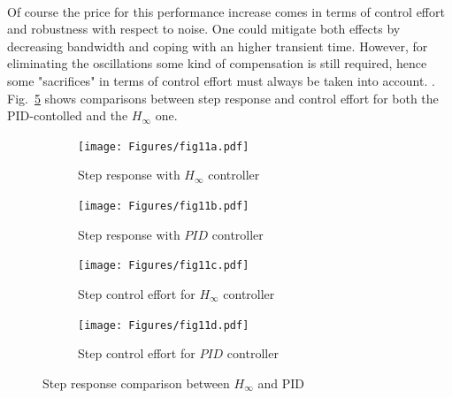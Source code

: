\documentclass[a4paper, 12pt]{article}
\begin{document}
\\Of course the price for this performance increase comes in terms of control effort and robustness with respect to noise. One could mitigate both effects by decreasing bandwidth and coping with an higher transient time. However, for eliminating the oscillations some kind of compensation is still required, hence some "sacrifices" in terms of control effort must always be taken into account. .\\
Fig.~\ref{fig:fig11} shows comparisons between step response and control effort for both the PID-contolled and the $H_\infty$ one.
\begin{figure}[h!]
 \begin{subfigure}[t]{0.45\textwidth}
    \texttt{[image: Figures/fig11a.pdf]}
    \captionsetup{margin=2mm}
    \caption{Step response with $H_\infty$ controller}
    \label{fig:fig11a}
    \end{subfigure}
    \begin{subfigure}[t]{0.45\textwidth}
       \texttt{[image: Figures/fig11b.pdf]}
       \captionsetup{margin=2mm}
       \caption{Step response with $PID$ controller}
       \label{fig:fig03b}
   \end{subfigure}
   \begin{subfigure}[t]{0.50\textwidth}
       \texttt{[image: Figures/fig11c.pdf]}
       \captionsetup{margin=2mm}
       \caption{Step control effort for $H_\infty$ controller}
       \label{fig:fig11c}
   \end{subfigure}
    \begin{subfigure}[t]{0.5\textwidth}
       \texttt{[image: Figures/fig11d.pdf]}
       \captionsetup{margin=2mm}
       \caption{Step control effort for $PID$ controller}
       \label{fig:fig11d}
   \end{subfigure}
   \caption{Step response comparison between $H_\infty$ and PID}
       \label{fig:fig11}
\end{figure}
\clearpage
\end{document}
